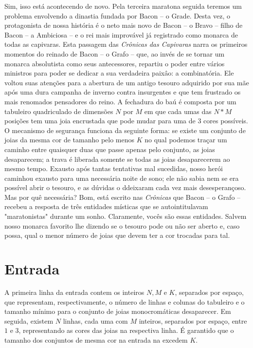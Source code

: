 Sim, isso está acontecendo de novo.
Pela terceira maratona seguida teremos um problema envolvendo a dinastia fundada por Bacon -- o Grade.
Desta vez, o protagonista de nossa história é o neto mais novo de Bacon -- o Bravo -- filho de Bacon -- a Ambiciosa -- e o rei mais improvável já registrado como monarca de todas as capivaras.
Esta passagem das \textit{Crônicas das Capivaras} narra os primeiros momentos do reinado de Bacon -- o Grafo -- que, ao invés de se tornar um monarca absolutista como seus antecessores, repartiu o poder entre vários ministros para poder se dedicar a sua verdadeira paixâo: a combinatória.
Ele voltou suas atenções para a abertura de um antigo tesouro adquirido por sua mãe após uma dura campanha de inverno contra insurgentes e que tem frustrado os mais renomados pensadores do reino.
A fechadura do baú é composta por um tabuleiro quadriculado de dimensões $N$ por $M$ em que cada umas das $N*M$ posições tem uma joia encrustada que pode mudar para uma de $3$ cores possíveis.
O mecanismo de segurança funciona da seguinte forma: se existe um conjunto de joias da mesma cor de tamanho pelo menos $K$ no qual podemos traçar um caminho entre quaisquer duas que passe apenas pelo conjunto, as joias desaparecem; a trava é liberada somente se todas as joias desaparecerem ao mesmo tempo.
Exausto após tantas tentativas mal sucedidas, nosso herói caminhou exausto para uma necessária noite de sono; ele não sabia nem se era possível abrir o tesouro, e as dúvidas o ddeixaram cada vez mais desesperançoso.
Mas por quê necessária?
Bom, está escrito nas \textit{Crônicas} que Bacon -- o Grafo -- recebeu a resposta de três entidades místicas que se autointitulavam "maratonistas" durante um sonho.
Claramente, vocês são essas entidades.
Salvem nosso monarca favorito lhe dizendo se o tesouro pode ou não ser aberto e, caso possa, qual o menor número de joias que devem ter a cor trocadas para tal.


\section*{Entrada}

A primeira linha da entrada contem os inteiros $N, M$ e $K$, separados por espaço, que representam, respectivamente, o número de linhas e colunas do tabuleiro e o tamanho mínimo para o conjunto de joias monocromáticas desaparecer.
Em seguida, existem $N$ linhas, cada uma com $M$ inteiros, separados por espaço, entre $1$ e $3$, representando as cores das joias na respectiva linha.
É garantido que o tamanho dos conjuntos de mesma cor na entrada na excedem $K$.

